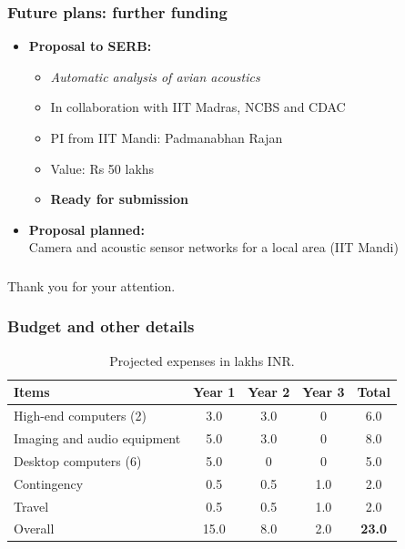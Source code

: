 \documentclass[mathserif]{beamer}
\begin{document}
\begin{frame}
\frametitle{Future plans: further funding}
\begin{itemize}
\item \textbf{Proposal to SERB:} 
	\begin{itemize}
	\item \textit{Automatic analysis of avian acoustics} 
	\item In collaboration with IIT Madras, NCBS and CDAC 
	\item PI from IIT Mandi: Padmanabhan Rajan
	\item Value: Rs 50 lakhs
	\item \textbf{Ready for submission}
	\end{itemize}

\item \textbf{Proposal planned:} \\Camera and acoustic sensor networks for a local area (IIT Mandi)
\end{itemize}
\end{frame}





\begin{frame}
\frametitle{}
\begin{center}
\Large{Thank you for your attention.}
\end{center}
\end{frame}


\begin{frame}
\frametitle{Budget and other details}

\begin{table}[th]
\centering
\caption{Projected expenses in lakhs INR.}
\begin{tabular}{|l|c|c|c|c|}
\hline
Items & Year 1 & Year 2 & Year 3 & Total\\
\hline
High-end computers (2) & 3.0 & 3.0 & 0 & 6.0\\
Imaging and audio equipment & 5.0 & 3.0 & 0 & 8.0 \\
Desktop computers (6) & 5.0 & 0 & 0 & 5.0  \\
Contingency & 0.5 & 0.5 & 1.0 & 2.0 \\
Travel & 0.5 & 0.5 & 1.0 & 2.0\\
\hline
Overall & 15.0 & 8.0 & 2.0 & \textbf{23.0} \\
\hline
\end{tabular}
\label{tab:funding}
\end{table}
\end{frame}
\end{document}
